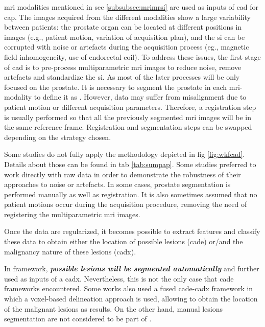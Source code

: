 \ac{mri} modalities mentioned in \acs{sec} \ref{subsubsec:mrimrsi} are used as inputs of \ac{cad} for \ac{cap}. %
The images acquired from the different modalities show a large variability between patients: the prostate organ can be located at different positions in images (e.g., patient motion, variation of acquisition plan), and the \ac{si} can be corrupted with noise or artefacts during the acquisition process (eg., magnetic field inhomogeneity, use of endorectal coil). To address these issues, the first stage of \ac{cad} is to pre-process multiparametric \ac{mri} images to reduce noise, remove artefacts and standardize the \ac{si}. As most of the later processes will be only focused on the prostate. It is necessary to segment the prostate in each \ac{mri}-modality to define it as . However, data may suffer from misalignment due to patient motion or different acquisition parameters. Therefore, a registration step is usually performed so that all the previously segmented \ac{mri} images will be in the same reference frame. Registration and segmentation steps can be swapped depending on the strategy chosen.

Some studies do not fully apply the methodology depicted in \acs{fig} \ref{fig:wkfcad}. Details about those can be found in \acs{tab} \ref{tab:sumpap}. Some studies preferred to work directly with raw data in order to demonstrate the robustness of their approaches to noise or artefacts. In some cases, prostate segmentation is performed manually as well as registration. It is also sometimes assumed that no patient motions occur during the acquisition procedure, removing the need of registering the multiparametric \ac{mri} images.

Once the data are regularized, it becomes possible to extract features and classify these data to obtain either the location of possible lesions (\ac{cade}) or/and the malignancy nature of these lesions (\ac{cadx}).

In  framework, \textbf{\textit{possible lesions will be segmented automatically}} and further used as inputs of a \ac{cadx}. Nevertheless, this is not the only case that \ac{cade} frameworks encountered. Some works also used a fused \ac{cade}-\ac{cadx} framework in which a voxel-based delineation approach is used, allowing to obtain the location of the malignant lesions as results. On the other hand, manual lesions segmentation are not considered to be part of .

